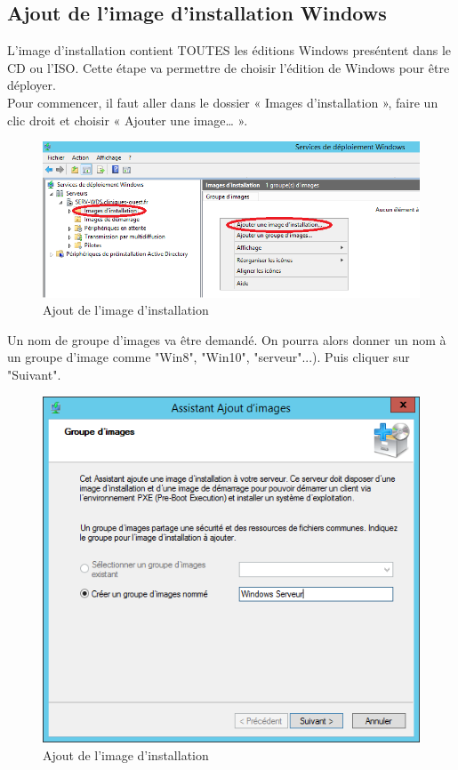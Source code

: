 \documentclass[11pt,a4paper,oneside]{article}
\begin{document}
\subsection{Ajout de l'image d'installation Windows}

L'image d'installation contient TOUTES les éditions Windows preséntent dans le CD ou l'ISO. Cette étape va permettre de choisir l'édition de Windows pour être déployer. \\

Pour commencer, il faut aller dans le dossier « Images d’installation », faire un clic droit et choisir « Ajouter une image… ».

\begin{figure}[hbtp]
\centering
\includegraphics[scale=0.7]{Pictures/Configuration/Conf12.png}
\caption{\label{etiquette} Ajout de l'image d'installation}
\end{figure}

Un nom de groupe d’images va être demandé. On pourra alors donner un nom à un groupe d’image comme "Win8", "Win10", "serveur"...). Puis cliquer sur "Suivant".

\begin{figure}[hbtp]
\centering
\includegraphics[scale=0.7]{Pictures/Configuration/Conf13.png}
\caption{\label{etiquette} Ajout de l'image d'installation}
\end{figure}
\newpage
\end{document}
